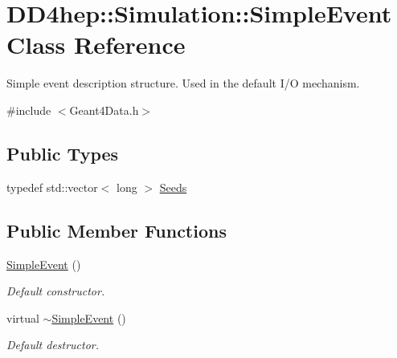 \hypertarget{class_d_d4hep_1_1_simulation_1_1_simple_event}{}\section{D\+D4hep\+:\+:Simulation\+:\+:Simple\+Event Class Reference}
\label{class_d_d4hep_1_1_simulation_1_1_simple_event}


Simple event description structure. Used in the default I/O mechanism.  




{\ttfamily \#include $<$Geant4\+Data.\+h$>$}

\subsection*{Public Types}
\begin{DoxyCompactItemize}
\item 
typedef std\+::vector$<$ long $>$ \hyperlink{class_d_d4hep_1_1_simulation_1_1_simple_event_a0a0e9b422036edb384b60a6f492eb8d4}{Seeds}
\end{DoxyCompactItemize}
\subsection*{Public Member Functions}
\begin{DoxyCompactItemize}
\item 
\hyperlink{class_d_d4hep_1_1_simulation_1_1_simple_event_a93eec2da5659fe2a6b03bda7362b0940}{Simple\+Event} ()
\begin{DoxyCompactList}\small\item\em Default constructor. \end{DoxyCompactList}\item 
virtual \hyperlink{class_d_d4hep_1_1_simulation_1_1_simple_event_a77e577dd4deef5466765196cc798c3b9}{$\sim$\+Simple\+Event} ()
\begin{DoxyCompactList}\small\item\em Default destructor. \end{DoxyCompactList}\end{DoxyCompactItemize}

